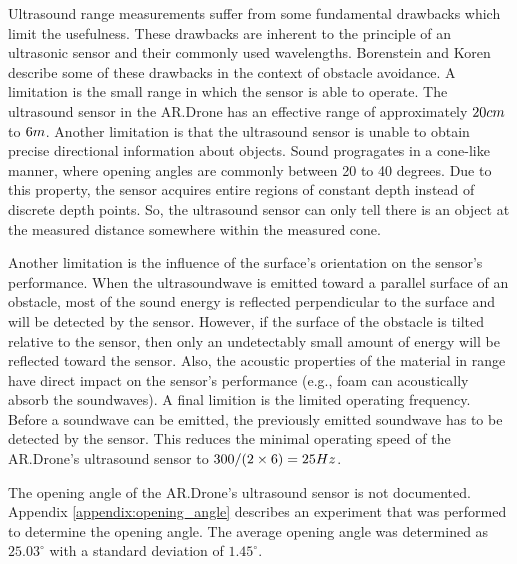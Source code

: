 Ultrasound range measurements suffer from some fundamental drawbacks which limit the usefulness.
These drawbacks are inherent to the principle of an ultrasonic sensor and their commonly used wavelengths.
Borenstein and Koren \cite{borenstein1988obstacle} describe some of these drawbacks in the context of obstacle avoidance.
A limitation is the small range in which the sensor is able to operate.
The ultrasound sensor in the AR.Drone has an effective range of approximately $20\small{cm}$ to $6\small{m}$.
Another limitation is that the ultrasound sensor is unable to obtain precise directional information about objects.
Sound progragates in a cone-like manner, where opening angles are commonly between 20 to 40 degrees.
Due to this property, the sensor acquires entire regions of constant depth instead of discrete depth points.
So, the ultrasound sensor can only tell there is an object at the measured distance somewhere within the measured cone.

Another limitation is the influence of the surface's orientation on the sensor's performance.
When the ultrasoundwave is emitted toward a parallel surface of an obstacle, most of the sound energy is reflected perpendicular to the surface and will be detected by the sensor.
However, if the surface of the obstacle is tilted relative to the sensor, then only an undetectably small amount of energy will be reflected toward the sensor.
Also, the acoustic properties of the material in range have direct impact on the sensor's performance (e.g., foam can acoustically absorb the soundwaves).
A final limition is the limited operating frequency.
Before a soundwave can be emitted, the previously emitted soundwave has to be detected by the sensor.
This reduces the minimal operating speed of the AR.Drone's ultrasound sensor to $300 / (2 \times 6) = 25\small{Hz}$.

The opening angle of the AR.Drone's ultrasound sensor is not documented.
Appendix \ref{appendix:opening_angle} describes an experiment that was performed to determine the opening angle.
The average opening angle was determined as $25.03^{\circ}$ with a standard deviation of $1.45^{\circ}$.

